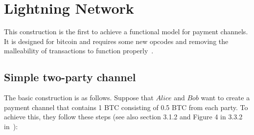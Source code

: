 \section{Lightning Network}
  This construction is the first to achieve a functional model for payment channels. It is
  designed for bitcoin and requires some new opcodes and removing the malleability of
  transactions to function properly~\cite{lightning}.

  \subsection{Simple two-party channel}
    The basic construction is as follows. Suppose that $Alice$ and $Bob$ want to create a
    payment channel that contains 1 BTC consisting of 0.5 BTC from each party. To achieve
    this, they follow these steps (see also section 3.1.2 and Figure 4 in 3.3.2
    in~\cite{lightning}):
